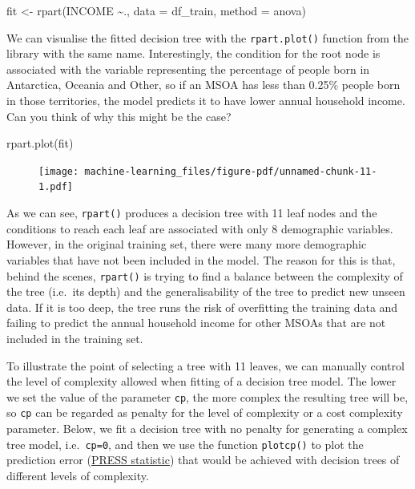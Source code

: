 \documentclass[
  letterpaper,
  DIV=11,
  numbers=noendperiod]{scrreprt}
\newenvironment{Shaded}{\begin{snugshade}}{\end{snugshade}}
\newcommand{\AttributeTok}[1]{\textcolor[rgb]{0.40,0.45,0.13}{#1}}
\newcommand{\FunctionTok}[1]{\textcolor[rgb]{0.28,0.35,0.67}{#1}}
\newcommand{\NormalTok}[1]{\textcolor[rgb]{0.00,0.23,0.31}{#1}}
\newcommand{\OtherTok}[1]{\textcolor[rgb]{0.00,0.23,0.31}{#1}}
\newcommand{\SpecialCharTok}[1]{\textcolor[rgb]{0.37,0.37,0.37}{#1}}
\newcommand{\StringTok}[1]{\textcolor[rgb]{0.13,0.47,0.30}{#1}}
\begin{document}
\begin{Shaded}
\begin{Highlighting}[]
\NormalTok{fit }\OtherTok{\textless{}{-}} \FunctionTok{rpart}\NormalTok{(INCOME }\SpecialCharTok{\textasciitilde{}}\NormalTok{., }\AttributeTok{data =}\NormalTok{ df\_train, }\AttributeTok{method =} \StringTok{\textquotesingle{}anova\textquotesingle{}}\NormalTok{)}
\end{Highlighting}
\end{Shaded}

We can visualise the fitted decision tree with the \texttt{rpart.plot()}
function from the library with the same name. Interestingly, the
condition for the root node is associated with the variable representing
the percentage of people born in Antarctica, Oceania and Other, so if an
MSOA has less than 0.25\% people born in those territories, the model
predicts it to have lower annual household income. Can you think of why
this might be the case?

\begin{Shaded}
\begin{Highlighting}[]
\FunctionTok{rpart.plot}\NormalTok{(fit)}
\end{Highlighting}
\end{Shaded}

\begin{figure}[H]

{\centering \texttt{[image: machine-learning\_files/figure-pdf/unnamed-chunk-11-1.pdf]}

}

\end{figure}

As we can see, \texttt{rpart()} produces a decision tree with 11 leaf
nodes and the conditions to reach each leaf are associated with only 8
demographic variables. However, in the original training set, there were
many more demographic variables that have not been included in the
model. The reason for this is that, behind the scenes, \texttt{rpart()}
is trying to find a balance between the complexity of the tree (i.e.~its
depth) and the generalisability of the tree to predict new unseen data.
If it is too deep, the tree runs the risk of overfitting the training
data and failing to predict the annual household income for other MSOAs
that are not included in the training set.

To illustrate the point of selecting a tree with 11 leaves, we can
manually control the level of complexity allowed when fitting of a
decision tree model. The lower we set the value of the parameter
\texttt{cp}, the more complex the resulting tree will be, so \texttt{cp}
can be regarded as penalty for the level of complexity or a cost
complexity parameter. Below, we fit a decision tree with no penalty for
generating a complex tree model, i.e.~\texttt{cp=0}, and then we use the
function \texttt{plotcp()} to plot the prediction error
(\href{https://en.wikipedia.org/wiki/PRESS_statistic}{PRESS statistic})
that would be achieved with decision trees of different levels of
complexity.
\end{document}
